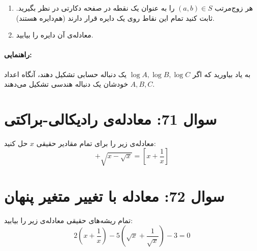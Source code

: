 \documentclass[12pt]{article}
\begin{document}
	\begin{enumerate}[label=(\alph*)]
		\item هر زوج‌مرتب \( (a,b) \in S \) را به عنوان یک نقطه در صفحه دکارتی در نظر بگیرید. ثابت کنید تمام این نقاط روی یک دایره قرار دارند (هم‌دایره هستند).
		\item معادله‌ی آن دایره را بیابید.
	\end{enumerate}
	
	\paragraph{راهنمایی:}
	به یاد بیاورید که اگر \( \log A, \log B, \log C \) یک دنباله حسابی تشکیل دهند، آنگاه اعداد \(A, B, C\) خودشان یک دنباله هندسی تشکیل می‌دهند.
	
	\vspace{1cm}
	\hrulefill
	\vspace{1cm}
	
	
	\section*{سوال 71: معادله‌ی رادیکالی-براکتی}
	معادله‌ی زیر را برای تمام مقادیر حقیقی \(x\) حل کنید:
	\begin{displaymath}
		[x] + \sqrt{x - \sqrt{x}} = \left[x + \frac{1}{x}\right]
	\end{displaymath}
	
	
	\vspace{1cm}
	\hrulefill
	\vspace{1cm}
	
	\section*{سوال 72: معادله با تغییر متغیر پنهان}
	تمام ریشه‌های حقیقی معادله‌ی زیر را بیابید:
	\begin{displaymath}
		2\left(x + \frac{1}{x}\right) - 5\left(\sqrt{x} + \frac{1}{\sqrt{x}}\right) - 3 = 0
	\end{displaymath}
	
\end{document}
